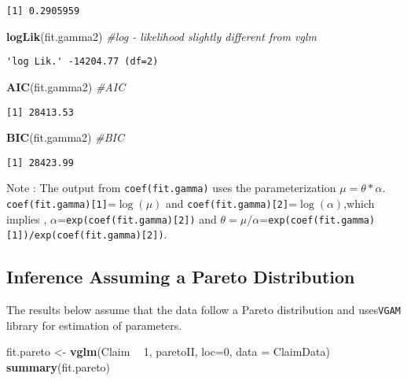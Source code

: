 \documentclass[]{book}
\newenvironment{Shaded}{\begin{snugshade}}{\end{snugshade}}
\newcommand{\KeywordTok}[1]{\textcolor[rgb]{0.13,0.29,0.53}{\textbf{#1}}}
\newcommand{\DataTypeTok}[1]{\textcolor[rgb]{0.13,0.29,0.53}{#1}}
\newcommand{\DecValTok}[1]{\textcolor[rgb]{0.00,0.00,0.81}{#1}}
\newcommand{\StringTok}[1]{\textcolor[rgb]{0.31,0.60,0.02}{#1}}
\newcommand{\CommentTok}[1]{\textcolor[rgb]{0.56,0.35,0.01}{\textit{#1}}}
\newcommand{\OperatorTok}[1]{\textcolor[rgb]{0.81,0.36,0.00}{\textbf{#1}}}
\newcommand{\NormalTok}[1]{#1}
\theoremstyle{definition}
\theoremstyle{definition}
\theoremstyle{definition}
\theoremstyle{remark}
\begin{document}
\begin{verbatim}
[1] 0.2905959
\end{verbatim}

\begin{Shaded}
\begin{Highlighting}[]
\KeywordTok{logLik}\NormalTok{(fit.gamma2)  }\CommentTok{#log - likelihood slightly different from vglm}
\end{Highlighting}
\end{Shaded}

\begin{verbatim}
'log Lik.' -14204.77 (df=2)
\end{verbatim}

\begin{Shaded}
\begin{Highlighting}[]
\KeywordTok{AIC}\NormalTok{(fit.gamma2)     }\CommentTok{#AIC}
\end{Highlighting}
\end{Shaded}

\begin{verbatim}
[1] 28413.53
\end{verbatim}

\begin{Shaded}
\begin{Highlighting}[]
\KeywordTok{BIC}\NormalTok{(fit.gamma2)     }\CommentTok{#BIC}
\end{Highlighting}
\end{Shaded}

\begin{verbatim}
[1] 28423.99
\end{verbatim}

Note : The output from \texttt{coef(fit.gamma)} uses the
parameterization \(\mu=\theta * \alpha\).
\texttt{coef(fit.gamma){[}1{]}}=\(\log(\mu)\) and
\texttt{coef(fit.gamma){[}2{]}}=\(\log(\alpha)\),which implies ,
\(\alpha\)=\texttt{exp(coef(fit.gamma){[}2{]})} and
\(\theta=\mu/\alpha\)=\texttt{exp(coef(fit.gamma){[}1{]})/exp(coef(fit.gamma){[}2{]})}.

\subsection{Inference Assuming a Pareto
Distribution}\label{inference-assuming-a-pareto-distribution}

The results below assume that the data follow a Pareto distribution and
uses\texttt{VGAM} library for estimation of parameters.

\begin{Shaded}
\begin{Highlighting}[]
\NormalTok{fit.pareto <-}\StringTok{ }\KeywordTok{vglm}\NormalTok{(Claim }\OperatorTok{~}\StringTok{ }\DecValTok{1}\NormalTok{, paretoII, }\DataTypeTok{loc=}\DecValTok{0}\NormalTok{, }\DataTypeTok{data =}\NormalTok{ ClaimData)}
\KeywordTok{summary}\NormalTok{(fit.pareto)}
\end{Highlighting}
\end{Shaded}
\end{document}
